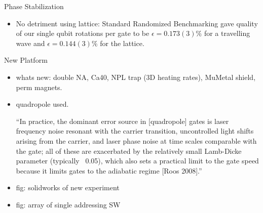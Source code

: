 \documentclass[final]{beamer}
\begin{document}
\begin{frame}{}
\begin{center}
\begin{columns}[t]
\begin{column}{0.49\textwidth}
\begin{alertblock}{Phase Stabilization}
\begin{itemize}
      \item No detriment using lattice: Standard Randomized
            Benchmarking gave quality of our single qubit rotations per
            gate to be $\epsilon = 0.173(3)\%$ for a travelling wave and
            $\epsilon = 0.144(3)\%$ for the lattice.\\
      \end{itemize}
    \end{alertblock}


    \begin{alertblock}{New Platform}
      \begin{itemize}
      \item whats new: double NA, Ca40, NPL trap (3D heating rates), MuMetal shield, perm magnets.
      \item quadropole used.

        ``In practice, the dominant error source in [quadropole] gates is laser
        frequency noise resonant with the carrier transition,
        uncontrolled light shifts arising from the carrier, and laser
        phase noise at time scales comparable with the gate; all of
        these are exacerbated by the relatively small Lamb-Dicke
        parameter (typically ~0.05), which also sets a practical limit
        to the gate speed because it limits gates to the adiabatic
        regime [Roos 2008].''

      \item fig: solidworks of new experiment
      \item fig: array of single addressing SW
      \end{itemize}


\end{alertblock}
\end{column}
\end{columns}
\end{center}
\end{frame}
\end{document}
